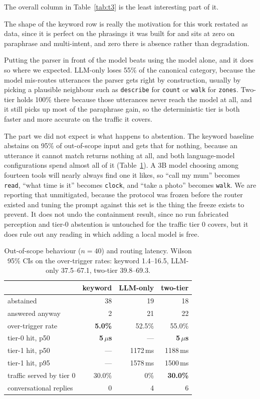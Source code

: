 \documentclass[sigconf,nonacm]{acmart}
\newcommand{\tool}[1]{\texttt{#1}}
\begin{document}
The overall column in Table~\ref{tab:t3} is the least interesting part of it.

The shape of the keyword row is really the motivation for this work restated as
data, since it is perfect on the phrasings it was built for and sits at zero on
paraphrase and multi-intent, and zero there is absence rather than degradation.

Putting the parser in front of the model beats using the model alone, and it
does so where we expected. LLM-only loses 55\% of the canonical category,
because the model mis-routes utterances the parser gets right by construction,
usually by picking a plausible neighbour such as \tool{describe} for
\tool{count} or \tool{walk} for \tool{zones}. Two-tier holds 100\% there because
those utterances never reach the model at all, and it still picks up most of the
paraphrase gain, so the deterministic tier is both faster and more accurate on
the traffic it covers.

The part we did not expect is what happens to abstention. The keyword baseline
abstains on 95\% of out-of-scope input and gets that for nothing, because an
utterance it cannot match returns nothing at all, and both language-model
configurations spend almost all of it (Table~\ref{tab:t5}). A 3B model choosing
among fourteen tools will nearly always find one it likes, so ``call my mum''
becomes \tool{read}, ``what time is it'' becomes \tool{clock}, and ``take a
photo'' becomes \tool{walk}. We are reporting that unmitigated, because the
protocol was frozen before the router existed and tuning the prompt against this
set is the thing the freeze exists to prevent. It does not undo the containment
result, since no run fabricated perception and tier-0 abstention is untouched
for the traffic tier 0 covers, but it does rule out any reading in which adding
a local model is free.

\begin{table}[t]
\caption{Out-of-scope behaviour ($n=40$) and routing latency. Wilson 95\% CIs on
the over-trigger rates: keyword 1.4--16.5, LLM-only 37.5--67.1, two-tier
39.8--69.3.}
\label{tab:t5}
\small
\begin{tabular}{lrrr}
\toprule
 & keyword & LLM-only & two-tier \\
\midrule
abstained            & 38 & 19 & 18 \\
answered anyway      & 2  & 21 & 22 \\
over-trigger rate    & \textbf{5.0\%} & 52.5\% & 55.0\% \\
\midrule
tier-0 hit, p50      & \textbf{5\,$\mu$s} & --- & \textbf{5\,$\mu$s} \\
tier-1 hit, p50      & --- & 1172\,ms & 1188\,ms \\
tier-1 hit, p95      & --- & 1578\,ms & 1500\,ms \\
traffic served by tier 0 & 30.0\% & 0\% & \textbf{30.0\%} \\
conversational replies   & 0 & 4 & 6 \\
\bottomrule
\end{tabular}
\end{table}
\end{document}
